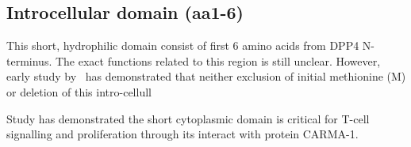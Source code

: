 \subsection{Introcellular domain (aa1-6)}

This short, hydrophilic domain consist of first 6 amino acids from DPP4 N-terminus. The exact functions related to this region is still unclear. However, early study by~\citet{Hong1990} has demonstrated that neither exclusion of initial methionine (M) or deletion of this intro-cellull

Study has demonstrated the short cytoplasmic domain is critical for T-cell signalling and proliferation through its interact with protein CARMA-1. \cite{Ohnuma_2007}